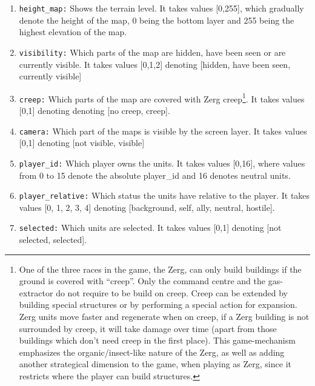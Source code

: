 \documentclass{article}
\begin{document}
\begin{enumerate}[noitemsep,start=0]
\item \texttt{height\_map:} Shows the terrain level. It takes values [0,255], 
which gradually denote the height of the map, 0 being the bottom layer and 255 
being the highest elevation of the map.
\item \texttt{visibility:} Which parts of the map are hidden, have been seen or 
are currently visible. It takes values [0,1,2] denoting [hidden, have been 
seen, currently visible]
\item \texttt{creep:} Which parts of the map are covered with Zerg 
creep\footnote{One of the three races in the game, the Zerg, can only build 
buildings if the ground is covered with ``creep''. Only the command centre and 
the gas-extractor do not require to be build on creep. Creep can be extended by 
building special structures or by performing a special action for expansion. 
Zerg units move faster and regenerate when on creep, if a Zerg building is not 
surrounded by creep, it will take damage over time (apart from those buildings 
which don't need creep in the first place). This game-mechanism  emphasizes the 
organic/insect-like nature of the Zerg, as well as adding another strategical 
dimension to the game, when playing as Zerg, since it restricts where the 
player can build structures.}. It takes values [0,1] denoting denoting [no 
creep, creep].
\item \texttt{camera:} Which part of the maps is visible by the screen layer. 
It takes values [0,1] denoting [not visible, visible]
\item \texttt{player\_id:} Which player owns the units. It takes values [0,16], 
where values from 0 to 15 denote the absolute player\_id and 16 denotes neutral 
units.
\item \texttt{player\_relative:} Which status the units have relative to the 
player. It takes values [0, 1, 2, 3, 4] denoting [background, self, ally, 
neutral, hostile].
\item \texttt{selected:} Which units are selected. It takes values [0,1] 
denoting [not selected, selected].
\end{enumerate}
\end{document}
